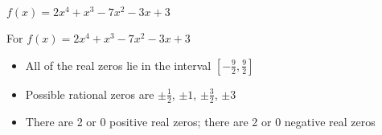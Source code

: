 {$f(x) = 2x^4+x^3-7x^2-3x+3$}
{For   $f(x) = 2x^4+x^3-7x^2-3x+3$
\begin{itemize}
\item  All of the real zeros lie in the interval $\left[-\frac{9}{2},\frac{9}{2}\right]$
\item  Possible rational zeros are  $\pm \frac{1}{2}$, $\pm 1$,  $\pm \frac{3}{2}$, $\pm 3$
\item  There are 2 or 0 positive real zeros;  there are 2 or 0 negative real zeros
\end{itemize}
}